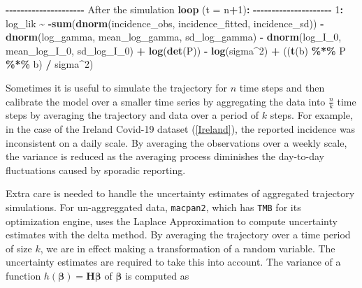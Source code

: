 \documentclass[
11pt, %
oneside, %
english, %
singlespacing, %
]{macthesis} %
\newenvironment{Shaded}{\begin{snugshade}}{\end{snugshade}}
\newcommand{\AttributeTok}[1]{\textcolor[rgb]{0.13,0.29,0.53}{#1}}
\newcommand{\DecValTok}[1]{\textcolor[rgb]{0.00,0.00,0.81}{#1}}
\newcommand{\FunctionTok}[1]{\textcolor[rgb]{0.13,0.29,0.53}{\textbf{#1}}}
\newcommand{\NormalTok}[1]{#1}
\newcommand{\SpecialCharTok}[1]{\textcolor[rgb]{0.81,0.36,0.00}{\textbf{#1}}}
\begin{document}
\begin{Shaded}
\begin{Highlighting}[]
\SpecialCharTok{{-}{-}{-}{-}{-}{-}{-}{-}{-}{-}{-}{-}{-}{-}{-}{-}{-}{-}{-}{-}{-}}
\NormalTok{After the simulation }\FunctionTok{loop}\NormalTok{ (}\AttributeTok{t =}\NormalTok{ n}\SpecialCharTok{+}\DecValTok{1}\NormalTok{)}\SpecialCharTok{:}
\SpecialCharTok{{-}{-}{-}{-}{-}{-}{-}{-}{-}{-}{-}{-}{-}{-}{-}{-}{-}{-}{-}{-}{-}}
\DecValTok{1}\SpecialCharTok{:}\NormalTok{ log\_lik }\SpecialCharTok{\textasciitilde{}} \SpecialCharTok{{-}}\FunctionTok{sum}\NormalTok{(}\FunctionTok{dnorm}\NormalTok{(incidence\_obs, incidence\_fitted, incidence\_sd)) }\SpecialCharTok{{-}}
              \FunctionTok{dnorm}\NormalTok{(log\_gamma, mean\_log\_gamma, sd\_log\_gamma) }\SpecialCharTok{{-}} 
              \FunctionTok{dnorm}\NormalTok{(log\_I\_0, mean\_log\_I\_0, sd\_log\_I\_0) }\SpecialCharTok{+}
              \FunctionTok{log}\NormalTok{(}\FunctionTok{det}\NormalTok{(P)) }\SpecialCharTok{{-}}
              \FunctionTok{log}\NormalTok{(sigma}\SpecialCharTok{\^{}}\DecValTok{2}\NormalTok{) }\SpecialCharTok{+} 
\NormalTok{              ((}\FunctionTok{t}\NormalTok{(b) }\SpecialCharTok{\%*\%}\NormalTok{ P }\SpecialCharTok{\%*\%}\NormalTok{ b) }\SpecialCharTok{/}\NormalTok{ sigma}\SpecialCharTok{\^{}}\DecValTok{2}\NormalTok{)}
\end{Highlighting}
\end{Shaded}

Sometimes it is useful to simulate the trajectory for \(n\) time steps and then calibrate the model over a smaller time series by aggregating the data into \(\frac{n}{k}\) time steps by averaging the trajectory and data over a period of \(k\) steps. For example, in the case of the Ireland Covid-19 dataset (\ref{Ireland}), the reported incidence was inconsistent on a daily scale. By averaging the observations over a weekly scale, the variance is reduced as the averaging process diminishes the day-to-day fluctuations caused by sporadic reporting.

Extra care is needed to handle the uncertainty estimates of aggregated trajectory simulations. For un-aggreggated data, \texttt{macpan2}, which has \texttt{TMB} for its optimization engine, uses the Laplace Approximation to compute uncertainty estimates with the delta method. By averaging the trajectory over a time period of size \(k\), we are in effect making a transformation of a random variable. The uncertainty estimates are required to take this into account. The variance of a function \(h(\boldsymbol{\beta}) = \mathbf{H} \boldsymbol{\beta}\) of \(\boldsymbol{\beta}\) is computed as
\end{document}
